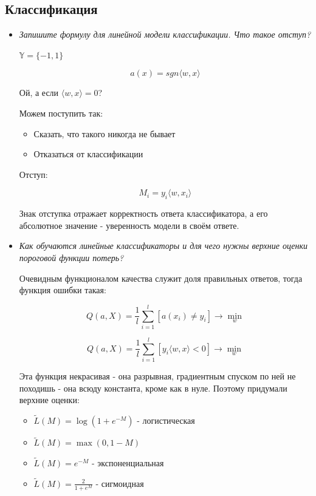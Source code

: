 \documentclass[12pt]{article}
\begin{document}
\subsection*{Классификация}

\begin{itemize}

\item \textit{Запишите формулу для линейной модели классификации. Что такое отступ?}

$\mathbb{Y} = \{ -1, 1 \}$

\[ a(x) = sgn \langle w, x \rangle \]

Ой, а если $\langle w, x \rangle = 0$?

Можем поступить так:
\begin{itemize}
\item Сказать, что такого никогда не бывает
\item Отказаться от классификации
\end{itemize}

Отступ:

\[ M_i = y_i \langle w, x_i \rangle \]

Знак отступка отражает корректность ответа классификатора, а его абсолютное значение - уверенность модели в своём ответе.

\item \textit{Как обучаются линейные классификаторы и для чего нужны верхние оценки пороговой функции потерь?}

Очевидным функционалом качества служит доля правильных ответов, тогда функция ошибки такая:

\[  Q(a, X) = \frac{1}{l} \sum_{i=1}^l [a(x_i) \neq y_i] \rightarrow \min_w \]

\[ Q(a, X) = \frac{1}{l} \sum_{i=1}^l [y_i \langle w, x \rangle < 0] \rightarrow \min_w \]

Эта функция некрасивая - она разрывная, градиентным спуском по ней не походишь - она всюду константа, кроме как в нуле. Поэтому придумали верхние оценки:

\begin{itemize}
\item $ \widetilde{L}(M) = \log (1+e^{-M}) $ - логистическая
\item $ \widetilde{L}(M) = \max(0, 1-M)$
\item $ \widetilde{L}(M) = e^{-M}$ - экспоненциальная
\item $ \widetilde{L}(M) = \frac{2}{1+e^M}$ - сигмоидная
\end{itemize}


\end{itemize}
\end{document}
